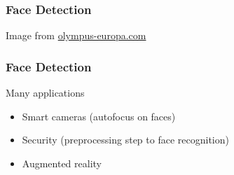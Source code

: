 \documentclass[xetex,professionalfont]{beamer}
\begin{document}
\begin{frame}
\frametitle{Face Detection}

\begin{center}
    {\centering Image from \url{olympus-europa.com}}
\end{center}

\end{frame}


\begin{frame}
\frametitle{Face Detection}

Many applications
\begin{itemize}
    \item Smart cameras (autofocus on faces)
    \item Security (preprocessing step to face recognition)
    \item Augmented reality
\end{itemize}

\end{frame}

\end{document}
